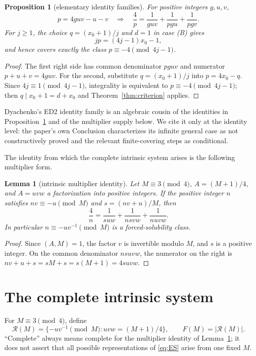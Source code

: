 \documentclass[10pt,reqno]{amsart}
\newtheorem{lemma}[theorem]{Lemma}
\newtheorem{proposition}[theorem]{Proposition}
\theoremstyle{definition}
\newcommand{\Rcal}{\mathscr R}
\newcommand{\1}{\mathbf 1}
\begin{document}
\begin{proposition}[elementary identity families]\label{prop:families}
For positive integers $g,u,v$,
\[
 p=4guv-u-v\quad\Longrightarrow\quad
 \frac4p=\frac1{guv}+\frac1{pgu}+\frac1{pgv}.
\]
For $j\geq1$, the choice $q=(x_0+1)/j$ and $d=1$ in case (B) gives
\[
 jp=(4j-1)x_0-1,
\]
and hence covers exactly the class $p\equiv-4\pmod{4j-1}$.
\end{proposition}
\begin{proof}
The first right side has common denominator $pguv$ and numerator $p+u+v=4guv$.  For the second, substitute $q=(x_0+1)/j$ into $p=4x_0-q$.  Since $4j\equiv1\pmod{4j-1}$, integrality is equivalent to $p\equiv-4\pmod{4j-1}$; then $q\mid x_0+1=d+x_0$ and Theorem~\ref{thm:criterion} applies.
\end{proof}
Dyachenko's ED2 identity family \cite{Dyachenko} is an algebraic cousin of
the identities in Proposition~\ref{prop:families} and of the multiplier
supply below.  We cite it only at the identity level: the paper's own
Conclusion characterizes its infinite general case as not constructively
proved and the relevant finite-covering steps as conditional.

The identity from which the complete intrinsic system arises is the following multiplier form.
\begin{lemma}[intrinsic multiplier identity]\label{lem:multiplier}
Let $M\equiv3\pmod4$, $A=(M+1)/4$, and $A=uvw$ a factorization into positive integers.  If the positive integer $n$ satisfies $nv\equiv-u\pmod M$ and $s=(nv+u)/M$, then
\begin{equation}\label{eq:mult-id}
 \frac4n=\frac1{suw}+\frac1{nsvw}+\frac1{nuvw}.
\end{equation}
In particular $n\equiv-uv^{-1}\pmod M$ is a forced-solubility class.
\end{lemma}
\begin{proof}
Since $(A,M)=1$, the factor $v$ is invertible modulo $M$, and $s$ is a positive integer.  On the common denominator $nsuvw$, the numerator on the right is
$nv+u+s=sM+s=s(M+1)=4suvw$.
\end{proof}

\section{The complete intrinsic system}\label{sec:intrinsic}
For $M\equiv3\pmod4$, define
\[
 \Rcal(M)=\{-uv^{-1}\pmod M:uvw=(M+1)/4\},
 \qquad F(M)=|\Rcal(M)|.
\]
``Complete'' always means complete for the multiplier identity of Lemma~\ref{lem:multiplier}; it does not assert that all possible representations of \eqref{eq:ES} arise from one fixed $M$.
\end{document}
